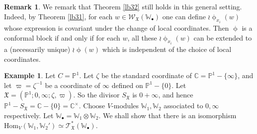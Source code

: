 \documentclass[12pt,b5paper,notitlepage]{report}
\theoremstyle{definition}
\newtheorem{eg}[df]{Example}
\newtheorem{rem}[df]{Remark}
\theoremstyle{plain}
\newcommand{\fk}{\mathfrak}
\newcommand{\Hom}{\mathrm{Hom}}
\newcommand{\scr}{\mathscr}
\newcommand{\blt}{\bullet}
\newcommand{\Wbb}{\mathbb W}
\newcommand{\Cbb}{\mathbb C}
\newcommand{\Pbb}{\mathbb P}
\numberwithin{equation}{section}
\begin{document}
\begin{rem}\label{lb40}
We remark that Theorem \ref{lb32} still holds in this general setting. Indeed, by Theorem \ref{lb31}, for each $w\in\scr W_{\fk X}(\Wbb_\blt)$ one can define $\wr\upphi_{x_i}(w)$ whose expression is covariant under the change of local coordinates. Then $\upphi$ is a conformal block if and only if for each $w$, all these $\wr\upphi_{x_i}(w)$ can be extended to  a (necessarily unique) $\wr\upphi(w)$ which is independent of the choice of local coordinates.
\end{rem}




\begin{eg}
Let $C=\Pbb^1$. Let $\zeta$ be the standard coordinate of $\Cbb=\Pbb^1-\{\infty\}$, and let $\varpi=\zeta^{-1}$ be a coordinate of $\infty$ defined on $\Pbb^1-\{0\}$. Let $\fk X=(\Pbb^1;0,\infty;\zeta,\varpi)$. So the divisor $S_{\fk X}$ is $0+\infty$, and hence $\Pbb^1-S_{\fk X}=\Cbb-\{0\}=\Cbb^\times$. Choose $V$-modules $\Wbb_1,\Wbb_2$ associated to $0,\infty$ respectively. Let $\Wbb_\blt=\Wbb_1\otimes\Wbb_2$. We shall show that there is an isomorphism $\Hom_V(\Wbb_1,\Wbb_2')\simeq\scr T_{\fk X}^*(\Wbb_\blt)$. 


\end{eg}
\end{document}
